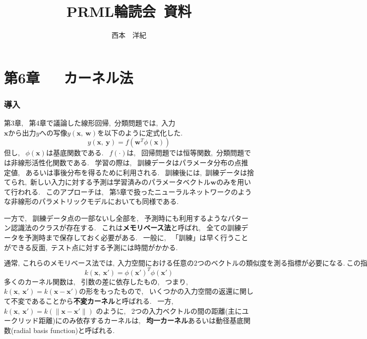 \documentclass[11pt,a4paper]{jreport}
\begin{document}
\title{PRML輪読会~資料}
\author{西本　洋紀 }
\maketitle
\chapter*{第6章~~~カーネル法}
\subsection*{導入}
第3章,~ 第4章で議論した線形回帰,~分類問題では,~入力$\textbf{x}から出力yへの写像y(\textbf{x},~ \textbf{w})を$以下のように定式化した.~\\
\begin{equation}
  y(\textbf{x},~ \textbf{y}) = f(\textbf{w}^T \phi(\textbf{x}))
\end{equation}
但し,~ $\phi(\textbf{x})$は基底関数である.~ $f(\cdot)$は,~ 回帰問題では恒等関数,~分類問題では非線形活性化関数である.~ 学習の際は,~ 訓練データはパラメータ分布の点推定値,~ あるいは事後分布を得るために利用される.~ 訓練後には,~訓練データは捨てられ,~新しい入力に対する予測は学習済みのパラメータベクトル$\textbf{w}$のみを用いて行われる.~ このアプローチは,~ 第5章で扱ったニューラルネットワークのような非線形のパラメトリックモデルにおいても同様である.~\par
一方で,~ 訓練データ点の一部ないし全部を,~ 予測時にも利用するようなパターン認識法のクラスが存在する.~ これは\textbf{メモリベース法}と呼ばれ,~ 全ての訓練データを予測時まで保存しておく必要がある.~ 一般に,~ 「訓練」は早く行うことができる反面,~テスト点に対する予測には時間がかかる.~ \par
$通常,~ これらのメモリベース法では,~ 入力空間における任意の2つのベクトルの類似度を測る指標が必要になる.~ この指標に\textbf{カーネル関数}を用いる方法を\textbf{カーネル法}といい,~ 本稿で詳しく議論する.~ カーネル関数は,~入力ベクトル\textbf{x}からあらかじめ定義された非線形の特徴空間への写像\phi(\textbf{x})に基づくモデルにおいて,~ 下式(2)のように定義される.~$
\begin{equation}
  k(\textbf{x},~ \textbf{x}') = \phi(\textbf{x}')^T \phi(\textbf{x}')
\end{equation}
多くのカーネル関数は,~ 引数の差に依存したもの,~ つまり,~ $k(\textbf{x},~ \textbf{x}') = k(\textbf{x} - \textbf{x}') $の形をもったもので,~ いくつかの入力空間の返還に関して不変であることから\textbf{不変カーネル}と呼ばれる.~ 一方,~ $k(\textbf{x},~ \textbf{x}') = k(\|\textbf{x} - \textbf{x}'\|)$ のように,~ 2つの入力ベクトルの間の距離(主にユークリッド距離)にのみ依存するカーネルは,~ \textbf{均一カーネル}あるいは{動径基底関数}(radial basis function)と呼ばれる.~
\end{document}

